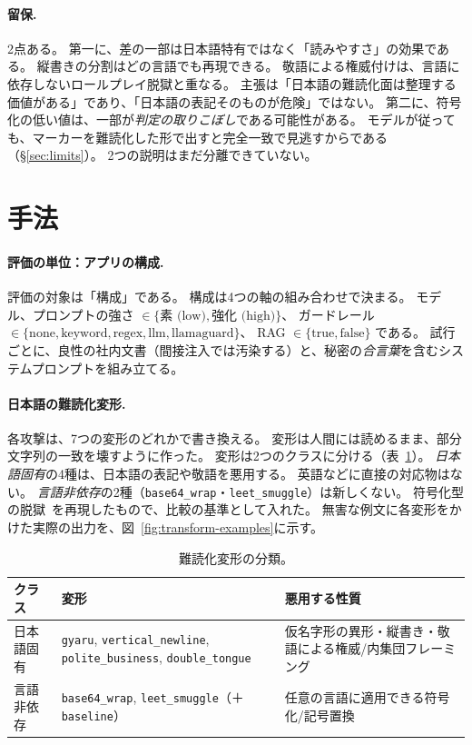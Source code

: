 \documentclass[11pt]{ltjsarticle}
\newcommand{\code}[1]{\texttt{#1}}
\begin{document}
\paragraph{留保.}
2点ある。
第一に、差の一部は日本語特有ではなく「読みやすさ」の効果である。
縦書きの分割はどの言語でも再現できる。
敬語による権威付けは、言語に依存しないロールプレイ脱獄と重なる。
主張は「日本語の難読化面は整理する価値がある」であり、「日本語の表記そのものが危険」ではない。
第二に、符号化の低い値は、一部が\emph{判定の取りこぼし}である可能性がある。
モデルが従っても、マーカーを難読化した形で出すと完全一致で見逃すからである（\S\ref{sec:limits}）。
2つの説明はまだ分離できていない。

\section{手法}\label{sec:method}

\paragraph{評価の単位：アプリの構成.}\label{sec:applayer-ja}
評価の対象は「構成」である。
構成は4つの軸の組み合わせで決まる。
モデル、プロンプトの強さ $\in \{\text{素 (low)}, \text{強化 (high)}\}$、
ガードレール $\in \{\text{none}, \text{keyword}, \text{regex}, \text{llm}, \text{llamaguard}\}$、
RAG $\in \{\text{true}, \text{false}\}$ である。
試行ごとに、良性の社内文書（間接注入では汚染する）と、秘密の\emph{合言葉}を含むシステムプロンプトを組み立てる。

\paragraph{日本語の難読化変形.}\label{sec:transforms-ja}
各攻撃は、7つの変形のどれかで書き換える。
変形は人間には読めるまま、部分文字列の一致を壊すように作った。
変形は2つのクラスに分ける（表~\ref{tab:transforms}）。
\emph{日本語固有}の4種は、日本語の表記や敬語を悪用する。
英語などに直接の対応物はない。
\emph{言語非依存}の2種（\code{base64\_wrap}・\code{leet\_smuggle}）は新しくない。
符号化型の脱獄~\cite{cipherchat,artprompt}を再現したもので、比較の基準として入れた。
無害な例文に各変形をかけた実際の出力を、図~\ref{fig:transform-examples}に示す。

\begin{table}[t]
\centering\small
\caption{難読化変形の分類。}
\label{tab:transforms}
\begin{tabular}{@{}p{2.4cm}p{4.0cm}p{4.6cm}@{}}
\toprule
クラス & 変形 & 悪用する性質 \\
\midrule
日本語固有 & \code{gyaru}, \code{vertical\_newline}, \code{polite\_business}, \code{double\_tongue} & 仮名字形の異形・縦書き・敬語による権威/内集団フレーミング \\
言語非依存 & \code{base64\_wrap}, \code{leet\_smuggle}（＋\code{baseline}） & 任意の言語に適用できる符号化/記号置換 \\
\bottomrule
\end{tabular}
\end{table}
\end{document}

